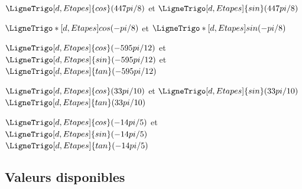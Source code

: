\begin{PresCodePL}{}
$\LigneTrigo[d,Etapes]{cos}(447pi/8)$ et $\LigneTrigo[d,Etapes]{sin}(447pi/8)$
\end{PresCodePL}

\begin{PresCodePL}{}
$\LigneTrigo*[d,Etapes]{cos}(-pi/8)$ et $\LigneTrigo*[d,Etapes]{sin}(-pi/8)$
\end{PresCodePL}

\begin{PresCodePL}{}
$\LigneTrigo[d,Etapes]{cos}(-595pi/12)$ et $\LigneTrigo[d,Etapes]{sin}(-595pi/12)$ et $\LigneTrigo[d,Etapes]{tan}(-595pi/12)$
\end{PresCodePL}

\begin{PresCodePL}{}
$\LigneTrigo[d,Etapes]{cos}(33pi/10)$ et $\LigneTrigo[d,Etapes]{sin}(33pi/10)$\\
$\LigneTrigo[d,Etapes]{tan}(33pi/10)$
\end{PresCodePL}

\begin{PresCodePL}{}
$\LigneTrigo[d,Etapes]{cos}(-14pi/5)$ et $\LigneTrigo[d,Etapes]{sin}(-14pi/5)$\\
$\LigneTrigo[d,Etapes]{tan}(-14pi/5)$
\end{PresCodePL}

\subsection{Valeurs disponibles}

